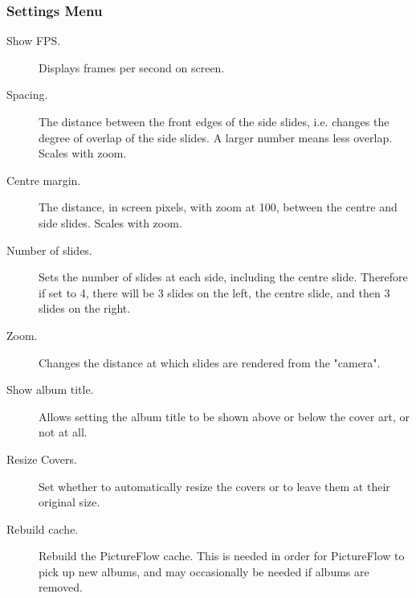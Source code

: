 \subsubsection{Settings Menu}

\begin{description}
  \item[Show FPS.] Displays frames per second on screen.
  \item[Spacing.] The distance between the front edges of the side slides, i.e. changes
  the degree of overlap of the side slides. A larger number means less overlap. Scales with zoom.
  \item[Centre margin.] The distance, in screen pixels, with zoom at 100, between
  the centre and side slides. Scales with zoom.
  \item[Number of slides.] Sets the number of slides at each side, including the
  centre slide. Therefore if set to 4, there will be 3 slides on the left,
  the centre slide, and then 3 slides on the right.
  \item[Zoom.] Changes the distance at which slides are rendered from the "camera".
  \item[Show album title.] Allows setting the album title to be shown above or
  below the cover art, or not at all.
  \item[Resize Covers.] Set whether to automatically resize the covers or to leave
  them at their original size.
  \item[Rebuild cache.] Rebuild the PictureFlow cache. This is needed in order
  for PictureFlow to pick up new albums, and may occasionally be needed if albums
  are removed.
\end{description}
